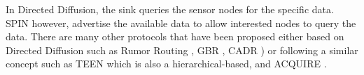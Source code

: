 In Directed Diffusion, the sink queries the sensor nodes for the specific data. SPIN however, advertise the available data to allow interested nodes to query the data. There are many other protocols that have been proposed either based on Directed Diffusion such as Rumor Routing \cite{rumorrouting}, GBR \cite{schurgers2001energy}, CADR \cite{cadr}) or following a similar concept such as TEEN \cite{teen} which is also a hierarchical-based, and ACQUIRE \cite{acquire}.




